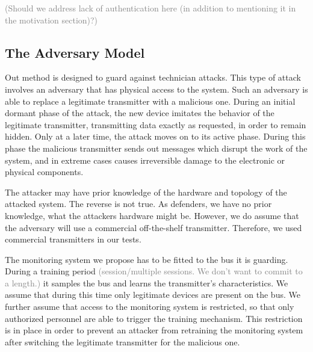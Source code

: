 \documentclass[conference]{IEEEtran}
\begin{document}
  \textcolor{gray}{(Should we address lack of authentication here (in addition to mentioning it in the motivation section)?)}

\subsection{The Adversary Model}
  Out method is designed to guard against technician attacks. This type of attack involves an adversary that has physical access to the system. Such an adversary is able to replace a legitimate transmitter with a malicious one. During an initial dormant phase of the attack, the new device imitates the behavior of the legitimate transmitter, transmitting data exactly as requested, in order to remain hidden. Only at a later time, the attack moves on to its active phase. During this phase the malicious transmitter sends out messages which disrupt the work of the system, and in extreme cases causes irreversible damage to the electronic or physical components.
  

  The attacker may have prior knowledge of the hardware and topology of the attacked system. The reverse is not true. As defenders, we have no prior knowledge, what the attackers hardware might be. However, we do assume that the adversary will use a commercial off-the-shelf transmitter. Therefore, we used commercial transmitters in our tests.

  The monitoring system we propose has to be fitted to the bus it is guarding. During a training period \textcolor{gray}{(session/multiple sessions. We don't want to commit to a length.)} it samples the bus and learns the transmitter's characteristics. We assume that during this time only legitimate devices are present on the bus. We further assume that access to the monitoring system is restricted, so that only authorized personnel are able to trigger the training mechanism. This restriction is in place in order to prevent an attacker from retraining the monitoring system after switching the legitimate transmitter for the malicious one. 
  
\end{document}
